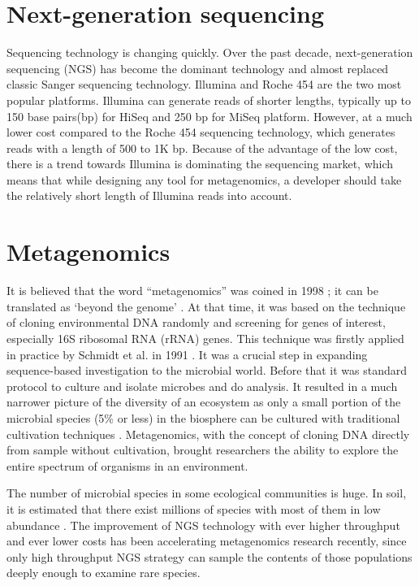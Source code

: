 \section{Next-generation sequencing} Sequencing technology is changing quickly.
Over the past decade, next-generation sequencing (NGS) has become the dominant
technology and almost replaced classic Sanger sequencing technology. Illumina
and Roche 454 are the two most popular platforms. Illumina can generate reads
of shorter lengths, typically up to 150 base pairs(bp) for HiSeq and 250 bp for MiSeq
platform\cite{Qin:2010aa, Mason:2012aa}.   %
However, at a much lower cost compared to the Roche 454 sequencing
technology, which generates reads with a length of 500 to 1K bp.
Because of the advantage of
the low cost, there is a trend towards Illumina is dominating the sequencing
market, which means that while designing any tool for metagenomics, a developer
should take the relatively short length of Illumina reads into account.


\section{Metagenomics} 
It is believed that the word ``metagenomics'' was coined
in 1998 \cite{Handelsman:1998aa}; it can be translated as `beyond the genome'
\cite{Gilbert:2011aa}. At that time, it was based on the technique of cloning
environmental DNA randomly and screening for genes of interest, especially 16S
ribosomal RNA (rRNA) genes. This technique was firstly applied in practice by
Schmidt et al. in 1991 \cite{Schmidt:1991aa}. It was a crucial step in
expanding sequence-based investigation to the microbial world. Before that it
was standard protocol to culture and isolate microbes and do analysis. It
resulted in a much narrower picture of the diversity of an ecosystem as only a
small portion of the microbial species (5\% or less) in the biosphere can be
cultured with traditional cultivation techniques \cite{Sogin:2006aa}.
Metagenomics, with the concept of cloning DNA directly from sample 
without cultivation, brought researchers the ability to explore the entire
spectrum of organisms in an environment.

The number of microbial species in some ecological communities is huge. In soil,
it is estimated that there exist millions of species with most of them in low
abundance \cite{Gans:2005aa}. The improvement of NGS technology with ever higher throughput and ever lower
costs has been accelerating metagenomics research recently, %
since only high throughput NGS strategy can sample the
contents of those populations deeply enough to examine rare species.

